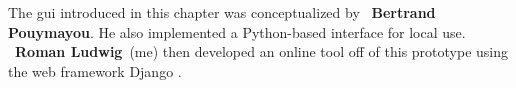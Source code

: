 \begin{tcolorbox}[
    title=\faIcon{users} Contributions,
    parbox=false,
    float
]
    The \acrlong{gui} introduced in this chapter was conceptualized by ~\textbf{Bertrand Pouymayou}. He also implemented a Python-based interface for local use. ~\textbf{Roman Ludwig}~(me) then developed an online tool off of this prototype using the web framework Django \cite{noauthor_django_2022}.
\end{tcolorbox}
